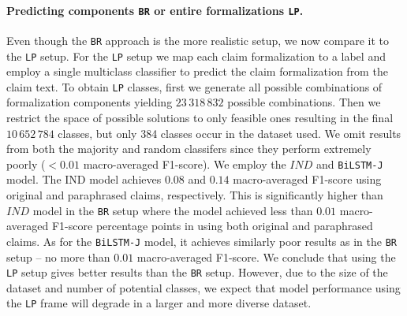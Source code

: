 \paragraph{Predicting components \texttt{BR} or entire formalizations \texttt{LP}.} 
Even though the
\texttt{BR} approach is the more realistic setup, we now compare it
to the \texttt{LP} setup. For the \texttt{LP} setup
we map each claim formalization to a label and employ a single multiclass
classifier to predict the claim formalization from the claim text.
To obtain \texttt{LP} classes, first we generate all possible combinations of 
formalization components yielding $23\,318\,832$ possible combinations.
Then we restrict the space of possible solutions to only feasible ones
resulting in the final $10\,652\,784$ classes, but only 384 classes
occur in the dataset used. 
We omit results from both the majority and random classifers since they
perform extremely poorly ($<0.01$ macro-averaged F1-score).
We employ the $IND$ and \texttt{BiLSTM-J} model. The IND model achieves 
$0.08$ and $0.14$ macro-averaged F1-score using original and
paraphrased claims, respectively. This is significantly higher than 
$IND$ model in the \texttt{BR} setup where the model achieved less than $0.01$
macro-averaged F1-score percentage points in using both original and paraphrased claims.
As for the \texttt{BiLSTM-J} model, it achieves similarly poor results as in the
\texttt{BR} setup -- no more than $0.01$ macro-averaged F1-score. 
We conclude that using the \texttt{LP} setup gives better results than the 
\texttt{BR} setup. However, due to the size of the dataset and number of potential 
classes, we expect that model performance using the \texttt{LP} frame
will degrade in a larger and more diverse dataset. 

